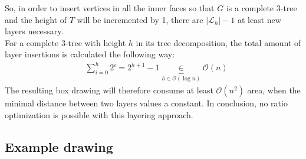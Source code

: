 So, in order to insert vertices in all the inner faces so that $G$ is a complete 3-tree and the height of $T$ will be incremented by 1, there are $|\mathcal{L}_h|-1$ at least new layers necessary.\\
For a complete 3-tree with height $h$ in its tree decomposition, the total amount of layer insertions is calculated the following way:
\begin{align*}
	&\sum_{i=0}^{h} 2^i = 2^{h+1}-1 \underbrace{\in}_{h\in \mathcal{O}(\log n)} \mathcal{O}(n)
\end{align*}
The resulting box drawing will therefore consume at least $\mathcal{O}(n^2)$ area, when the minimal distance between two layers values a constant. In conclusion, no ratio optimization is possible with this layering approach.

\subsection{Example drawing}

